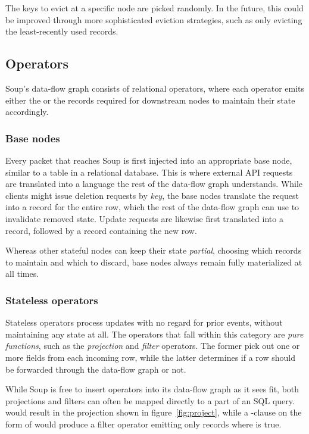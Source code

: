 The keys to evict at a specific node are picked randomly. In the future, this
could be improved through more sophisticated eviction strategies, such as only
evicting the least-recently used records.

\subsection{Operators}

Soup's data-flow graph consists of relational operators, where each operator
emits either the  or the  records required for
downstream nodes to maintain their state accordingly.

\subsubsection{Base nodes}

Every packet that reaches Soup is first injected into an appropriate base node,
similar to a table in a relational database. This is where external API requests
are translated into a language the rest of the data-flow graph understands.
While clients might issue \eg deletion requests by \textit{key}, the base nodes
translate the request into a  record for the entire row, which
the rest of the data-flow graph can use to invalidate removed state. Update
requests are likewise first translated into a  record, followed
by a  record containing the new row.

Whereas other stateful nodes can keep their state \textit{partial}, choosing
which records to maintain and which to discard, base nodes always remain fully
materialized at all times.

\subsubsection{Stateless operators}

Stateless operators process updates with no regard for prior events, without
maintaining any state at all. The operators that fall within this category are
\textit{pure functions}, such as the \textit{projection} and \textit{filter}
operators. The former pick out one or more fields from each incoming row, while
the latter determines if a row should be forwarded through the data-flow graph
or not.

While Soup is free to insert operators into its data-flow graph as it sees fit,
both projections and filters can often be mapped directly to a part of an SQL
query.  would result in the projection shown in
figure~\ref{fig:project}, while a -clause on the form of  would produce a filter operator emitting only records where  is true.

